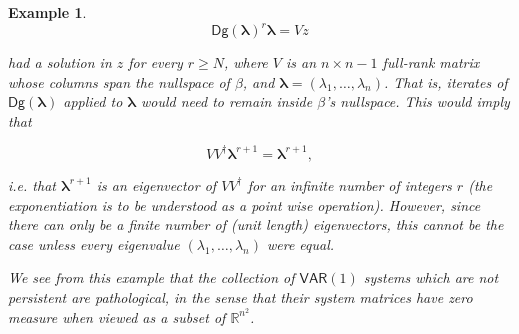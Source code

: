 \documentclass{statsoc}
\def\VAR{\mathsf{VAR}}  %
\newtheorem{example}{Example}
\def\R{\mathbb{R}}  %
\def\Dg{\mathsf{Dg }}   %
\begin{document}
\begin{example}
  \begin{equation*}
    \Dg(\bm{\lambda})^r \bm{\lambda} = Vz
  \end{equation*}

  had a solution in $z$ for every $r \ge N$, where $V$ is an
  $n \times n - 1$ full-rank matrix whose columns span the nullspace of $\beta$,
  and $\bm{\lambda} = (\lambda_1, \ldots, \lambda_n)$. That is,
  iterates of $\Dg(\bm{\lambda})$ applied to $\bm{\lambda}$ would need to remain
  inside $\beta$'s nullspace.  This would imply that

  \begin{equation*}
    VV^\dagger \bm{\lambda}^{r + 1} = \bm{\lambda}^{r + 1},
  \end{equation*}

  i.e. that $\bm{\lambda}^{r + 1}$ is an eigenvector of $VV^\dagger$
  for an infinite number of integers $r$ (the exponentiation is to be
  understood as a point wise operation).  However, since there can only
  be a finite number of (unit length) eigenvectors, this cannot be the
  case unless every eigenvalue $(\lambda_1, \ldots, \lambda_n)$ were
  equal.

  We see from this example that the collection of $\VAR(1)$ systems
  which are not persistent are pathological, in the sense that their
  system matrices have zero measure when viewed as a subset of $\R^{n^2}$.
\end{example}
\end{document}
